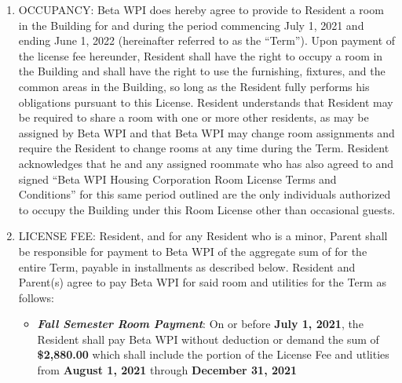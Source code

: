 \documentclass[legalpaper, 12pt]{article} \usepackage{lease}
\begin{document}
\begin{enumerate} 

        \item OCCUPANCY:  Beta WPI does hereby agree to provide to Resident a
                room in the Building for and during the period commencing July
                1, 2021 and ending June 1, 2022 (hereinafter referred to as the
                “Term”). Upon payment of the license fee hereunder, Resident
                shall have the right to occupy a room in the Building and shall
                have the right to use the furnishing, fixtures, and the common
                areas in the Building, so long as the Resident fully performs
                his obligations pursuant to this License.  Resident understands
                that Resident may be required to share a room with one or more
                other residents, as may be assigned by Beta WPI and that Beta
                WPI may change room assignments and require the Resident to
                change rooms at any time during the Term. Resident acknowledges
                that he and any assigned roommate who has also agreed to and
                signed “Beta WPI Housing Corporation Room License Terms and
                Conditions” for this same period outlined are the only
                individuals authorized to occupy the Building under this Room
                License other than occasional guests.

        \item LICENSE FEE: Resident, and for any Resident who is a minor, Parent
                shall be responsible for payment to Beta WPI of the aggregate
                sum of \hspace{2cm} for the entire Term, payable in installments
                as described below. Resident and Parent(s) agree to pay Beta WPI
                for said room and utilities for the Term as follows:

                \begin{itemize} 
                                
                        \item \textbf{\textit{Fall Semester Room Payment}}: On
                                or before \textbf{July 1, 2021}, the Resident
                                shall pay Beta WPI without deduction or demand
                                the sum of \textbf{\$2,880.00} which shall
                                include the portion of the License Fee and
                                utlities from \textbf{August 1, 2021} through
                                \textbf{December 31, 2021}


\end{itemize}
\end{enumerate}
\end{document}
